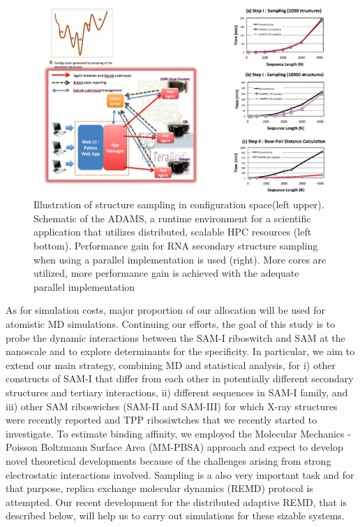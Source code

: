 \documentclass[a4paper,10pt]{article}
\begin{document}
\begin{figure}
\begin{center}
  \includegraphics[scale=0.4]{n-dep.jpg}
\end{center}
\caption{Illustration of structure sampling in configuration space(left upper). Schematic of the ADAMS, a runtime environment for a scientific application that utilizes distributed, scalable HPC resources (left bottom).  Performance gain for RNA secondary structure sampling when using a parallel implementation is used (right).  More cores are utilized, more performance gain is achieved with the adequate parallel implementation}
\label{fig:folding energy landscape}
\end{figure}


As for simulation costs, major proportion of our allocation will be used for atomistic MD simulations.  Continuing our efforts, the goal of this study is to probe the dynamic interactions between the SAM-I riboswitch and SAM at the nanoscale and to explore determinants for the specificity. In particular, we aim to extend our main strategy, combining MD and statistical analysis, for i) other constructs of SAM-I that differ from each other in potentially different secondary structures and tertiary interactions, ii) different sequences in SAM-I family, and iii) other SAM riboswiches (SAM-II and SAM-III) for which X-ray structures were recently reported and TPP ribosiwtches that we recently started to investigate.  To estimate binding affinity, we employed the Molecular Mechanics - Poisson Boltzmann Surface Area (MM-PBSA) approach and expect to develop novel theoretical developments because of the challenges arising from strong electrostatic interactions involved.  Sampling is a also very important task and for that purpose, replica exchange molecular dynamics (REMD) protocol is attempted.  Our recent development for the distributed adaptive REMD, that is described below, will help us to carry out simulations for these sizable systems.
\end{document}
